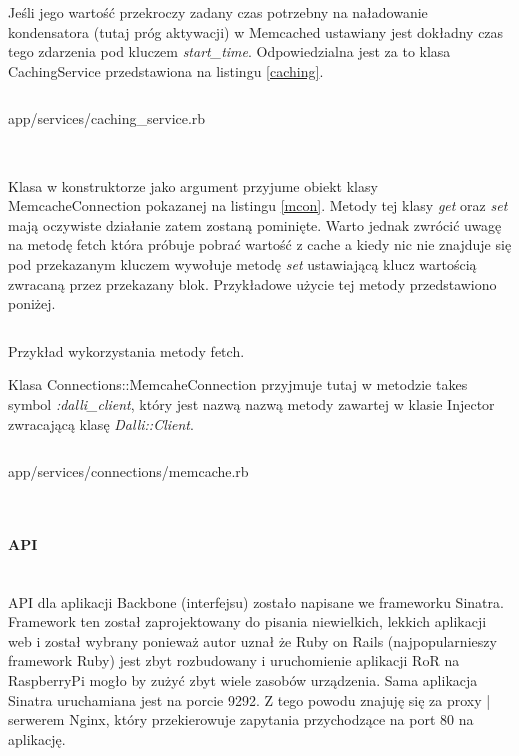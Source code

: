 \documentclass[11pt,a4paper, twoside]{article}
\begin{document}
Jeśli jego wartość przekroczy zadany czas potrzebny na naładowanie kondensatora (tutaj próg aktywacji) w Memcached ustawiany jest dokładny czas tego zdarzenia pod kluczem \emph{start\_time}. Odpowiedzialna jest za to klasa CachingService przedstawiona na listingu \ref{caching}.
\newpage
\begin{listing}[H]
\inputminted[linenos=true]{ruby}{./src/cachingservice.rb}
\caption{app/services/caching\_service.rb}
$\label{caching}$
\end{listing}
\noindent
Klasa w konstruktorze jako argument przyjume obiekt klasy \mbox{MemcacheConnection} pokazanej na listingu \ref{mcon}. Metody tej klasy \emph{get} oraz \emph{set} mają oczywiste działanie zatem zostaną pominięte. Warto jednak zwrócić uwagę na metodę fetch która próbuje pobrać wartość z cache a kiedy nic nie znajduje się pod przekazanym kluczem wywołuje metodę \emph{set} ustawiającą klucz wartością zwracaną przez przekazany blok. Przykładowe użycie tej metody przedstawiono poniżej.
\begin{listing}
\inputminted[linenos=true]{ruby}{./src/fetch.rb}
\caption{Przykład wykorzystania metody fetch.}
\end{listing}
\newpage
\noindent
Klasa Connections::MemcaheConnection przyjmuje tutaj w metodzie takes symbol \emph{:dalli\_client}, który jest nazwą nazwą metody zawartej w klasie Injector zwracającą klasę \emph{Dalli::Client}.
\begin{listing}
\inputminted[linenos=true]{ruby}{./src/memcache.rb}
\caption{app/services/connections/memcache.rb}
$\label{mcon}$
\end{listing}
\paragraph{API} ~\\
API dla aplikacji Backbone (interfejsu) zostało napisane we frameworku Sinatra. Framework ten został  zaprojektowany do pisania niewielkich, lekkich aplikacji web i został wybrany ponieważ autor uznał że Ruby on Rails (najpopularnieszy framework Ruby) jest zbyt rozbudowany i uruchomienie aplikacji RoR na RaspberryPi mogło by zużyć zbyt wiele zasobów urządzenia. Sama aplikacja Sinatra uruchamiana jest na porcie 9292. Z tego powodu znajuję się za proxy | serwerem Nginx, który przekierowuje zapytania przychodzące na port 80 na aplikację.
\end{document}
